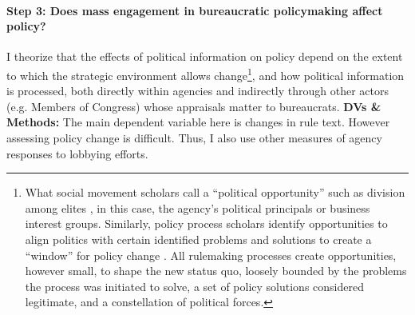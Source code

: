 

\paragraph{Step 3: Does mass engagement in bureaucratic policymaking affect policy?} 

I theorize that the effects of political information on policy depend on the extent to which the strategic environment allows change\footnote{
What social movement scholars call a ``political opportunity'' \citep{Mcadam2017} such as division among elites \citep{Tarrow1994}, in this case, the agency's political principals or business interest groups. Similarly, policy process scholars identify opportunities to align politics with certain identified problems and solutions to create a ``window'' for policy change \citep{Kingdon1984}. All rulemaking processes create opportunities, however small, to shape the new status quo, loosely bounded by the problems the process was initiated to solve, a set of policy solutions considered legitimate, and a constellation of political forces.
}, and how political information is processed, both directly within agencies and indirectly through other actors (e.g. Members of Congress) whose appraisals matter to bureaucrats.
\textbf{DVs \& Methods:} The main dependent variable here is changes in rule text. However assessing policy change is difficult. Thus, I also use other measures of agency responses to lobbying efforts. 
